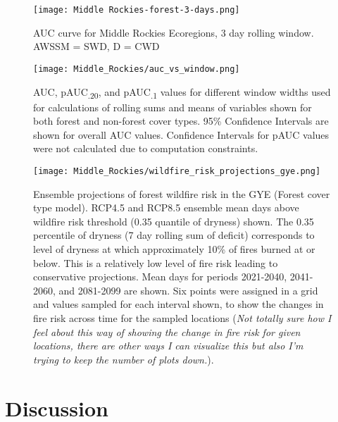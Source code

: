 \documentclass[11pt]{article}
\begin{document}
\begin{figure}
  \centering
  \texttt{[image: Middle Rockies-forest-3-days.png]}
  \caption{AUC curve for Middle Rockies Ecoregions, 3 day rolling window. AWSSM = SWD, D = CWD}
  \label{fig:auc}
\end{figure}

\begin{figure}[ht]
  \centering
  \texttt{[image: Middle\_Rockies/auc\_vs\_window.png]}
  \caption{AUC, pAUC\textsubscript{.20}, and pAUC\textsubscript{.1} values for different window widths used for calculations of rolling sums and means of variables shown for both forest and non-forest cover types. 95\% Confidence Intervals are shown for overall AUC values.  Confidence Intervals for pAUC values were not calculated due to computation constraints.}
  \label{fig:auc_window}
\end{figure}

\begin{figure}
  \centering
  \texttt{[image: Middle\_Rockies/wildfire\_risk\_projections\_gye.png]}
  \caption{Ensemble projections of forest wildfire risk in the GYE (Forest cover type model).  RCP4.5 and RCP8.5 ensemble mean days above wildfire risk threshold (0.35 quantile of dryness) shown.  The 0.35 percentile of dryness (7 day rolling sum of deficit) corresponds to level of dryness at which approximately 10\% of fires burned at or below.  This is a relatively low level of fire risk leading to conservative projections.  Mean days for periods 2021-2040, 2041-2060, and 2081-2099 are shown.  Six points were assigned in a grid and values sampled for each interval shown, to show the changes in fire risk across time for the sampled locations (\textit{Not totally sure how I feel about this way of showing the change in fire risk for given locations, there are other ways I can visualize this but also I'm trying to keep the number of plots down.}).}
  \label{fig:projected-risk}
\end{figure}

\section{Discussion}
\end{document}
